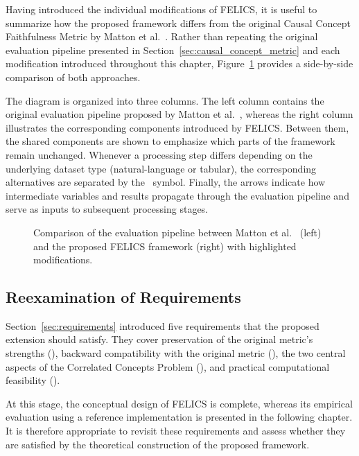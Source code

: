 Having introduced the individual modifications of FELICS, it is useful to summarize how the proposed framework differs from the original Causal Concept Faithfulness Metric by Matton et al.~\cite{mattonWalkTalkMeasuring2024}. Rather than repeating the original evaluation pipeline presented in Section~\ref{sec:causal_concept_metric} and each modification introduced throughout this chapter, Figure~\ref{fig:comparison_matton_felics} provides a side-by-side comparison of both approaches.

The diagram is organized into three columns. The left column contains the original evaluation pipeline proposed by Matton et al.~\cite{mattonWalkTalkMeasuring2024}, whereas the right column illustrates the corresponding components introduced by FELICS. Between them, the shared components are shown to emphasize which parts of the framework remain unchanged. Whenever a processing step differs depending on the underlying dataset type (natural-language or tabular), the corresponding alternatives are separated by the \textbullet\ symbol. Finally, the arrows indicate how intermediate variables and results propagate through the evaluation pipeline and serve as inputs to subsequent processing stages.

\begin{figure}
	\centering
	
	\caption{Comparison of the evaluation pipeline between Matton et al.~\cite{mattonWalkTalkMeasuring2024} (left) and the proposed FELICS framework (right) with highlighted modifications.}
	\label{fig:comparison_matton_felics}
\end{figure}

\subsection{Reexamination of Requirements}
\label{sec:requirements_reexamination}
Section~\ref{sec:requirements} introduced five requirements that the proposed extension should satisfy. They cover preservation of the original metric's strengths (), backward compatibility with the original metric (), the two central aspects of the Correlated Concepts Problem (), and practical computational feasibility ().

At this stage, the conceptual design of FELICS is complete, whereas its empirical evaluation using a reference implementation is presented in the following chapter. It is therefore appropriate to revisit these requirements and assess whether they are satisfied by the theoretical construction of the proposed framework.

